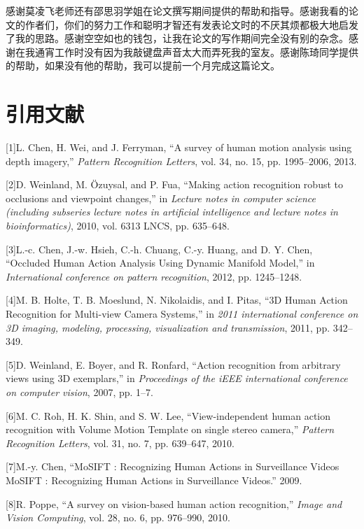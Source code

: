 感谢莫凌飞老师还有邵思羽学姐在论文撰写期间提供的帮助和指导。感谢我看的论文的作者们，你们的努力工作和聪明才智还有发表论文时的不厌其烦都极大地启发了我的思路。感谢空空如也的钱包，让我在论文的写作期间完全没有别的杂念。感谢在我通宵工作时没有因为我敲键盘声音太大而弄死我的室友。感谢陈琦同学提供的帮助，如果没有他的帮助，我可以提前一个月完成这篇论文。

\section*{引用文献}\label{ux5f15ux7528ux6587ux732e}

{[}1{]}L. Chen, H. Wei, and J. Ferryman, ``A survey of human motion
analysis using depth imagery,'' \emph{Pattern Recognition Letters}, vol.
34, no. 15, pp. 1995--2006, 2013.

{[}2{]}D. Weinland, M. Özuysal, and P. Fua, ``Making action recognition
robust to occlusions and viewpoint changes,'' in \emph{Lecture notes in
computer science (including subseries lecture notes in artificial
intelligence and lecture notes in bioinformatics)}, 2010, vol. 6313
LNCS, pp. 635--648.

{[}3{]}L.-c. Chen, J.-w. Hsieh, C.-h. Chuang, C.-y. Huang, and D. Y.
Chen, ``Occluded Human Action Analysis Using Dynamic Manifold Model,''
in \emph{International conference on pattern recognition}, 2012, pp.
1245--1248.

{[}4{]}M. B. Holte, T. B. Moeslund, N. Nikolaidis, and I. Pitas, ``3D
Human Action Recognition for Multi-view Camera Systems,'' in \emph{2011
international conference on 3D imaging, modeling, processing,
visualization and transmission}, 2011, pp. 342--349.

{[}5{]}D. Weinland, E. Boyer, and R. Ronfard, ``Action recognition from
arbitrary views using 3D exemplars,'' in \emph{Proceedings of the iEEE
international conference on computer vision}, 2007, pp. 1--7.

{[}6{]}M. C. Roh, H. K. Shin, and S. W. Lee, ``View-independent human
action recognition with Volume Motion Template on single stereo
camera,'' \emph{Pattern Recognition Letters}, vol. 31, no. 7, pp.
639--647, 2010.

{[}7{]}M.-y. Chen, ``MoSIFT : Recognizing Human Actions in Surveillance
Videos MoSIFT : Recognizing Human Actions in Surveillance Videos.''
2009.

{[}8{]}R. Poppe, ``A survey on vision-based human action recognition,''
\emph{Image and Vision Computing}, vol. 28, no. 6, pp. 976--990, 2010.

